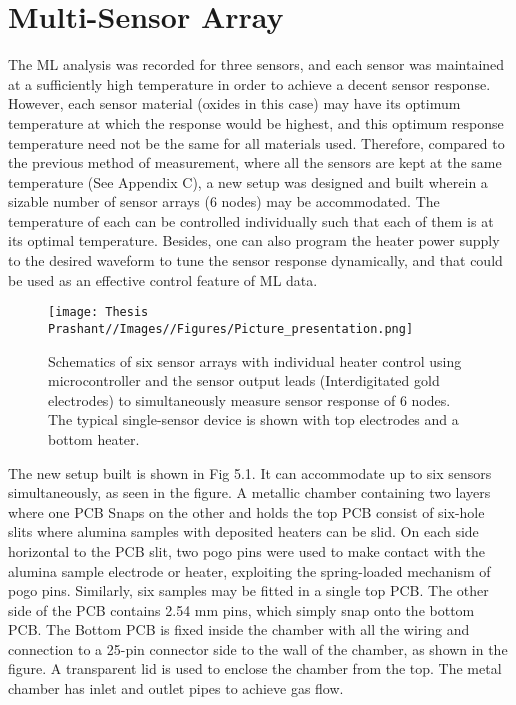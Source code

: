 \chapter{Multi-Sensor Array}
The ML analysis was recorded for three sensors, and each sensor was maintained at a sufficiently high temperature in order to achieve a decent sensor response. However, each sensor material (oxides in this case) may have its optimum temperature at which the response would be highest, and this optimum response temperature need not be the same for all materials used. Therefore, compared to the previous method of measurement, where all the sensors are kept at the same temperature (See Appendix C), a new setup was designed and built wherein a sizable number of sensor arrays (6 nodes) may be accommodated. The temperature of each can be controlled individually such that each of them is at its optimal temperature. Besides, one can also program the heater power supply to the desired waveform to tune the sensor response dynamically, and that could be used as an effective control feature of ML data.
\begin{figure}
    \centering
    \texttt{[image: Thesis Prashant//Images//Figures/Picture\_presentation.png]}
    \caption{Schematics of six sensor arrays with individual heater control using microcontroller and the sensor output leads (Interdigitated gold electrodes) to simultaneously measure sensor response of 6 nodes. The typical single-sensor device is shown with top electrodes and a bottom heater.}
    \label{setupl}
\end{figure}

The new setup built is shown in Fig 5.1. It can accommodate up to six sensors simultaneously, as seen in the figure. A metallic chamber containing two layers where one PCB Snaps on the other and holds the top PCB consist of six-hole slits where alumina samples with deposited heaters can be slid. On each side horizontal to the PCB slit, two pogo pins were used to make contact with the alumina sample electrode or heater, exploiting the spring-loaded mechanism of pogo pins. Similarly, six samples may be fitted in a single top PCB. The other side of the PCB contains 2.54 mm pins, which simply snap onto the bottom PCB. The Bottom PCB is fixed inside the chamber with all the wiring and connection to a 25-pin connector side to the wall of the chamber, as shown in the figure. A transparent lid is used to enclose the chamber from the top. The metal chamber has inlet and outlet pipes to achieve gas flow. 

